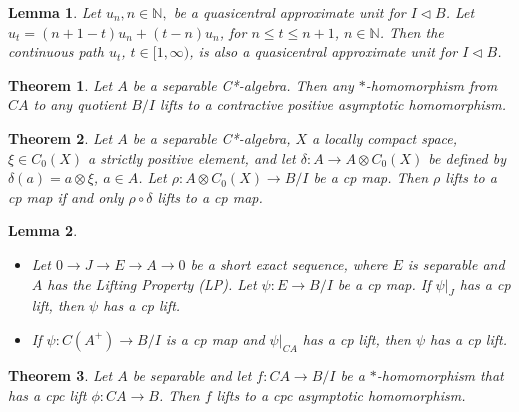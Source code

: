 \documentclass[10pt,a4paper]{amsart}
\newtheorem{lemma}{Lemma}
\newtheorem{theorem}{Theorem}
\begin{document}
\begin{lemma}\label{continuousqau} Let $u_n, n\in \mathbb N,$ be a quasicentral approximate unit for $I\triangleleft B$. Let $u_t = (n+1-t)u_n + (t-n)u_n$, for $n\le t\le n+1$, $n\in \mathbb N$. Then the continuous path $u_t$, $t\in [1, \infty)$, is also a quasicentral approximate unit for $I\triangleleft B$.
\end{lemma}

\begin{theorem}\label{cones} Let $A$ be a  separable C*-algebra. Then any $\ast$-homomorphism from $CA$ to any quotient $B/I$ lifts to a contractive positive asymptotic homomorphism.
\end{theorem}

\begin{theorem}\label{LiftingDuality}   Let $A$  be a separable C*-algebra, $X$ a locally compact space, $\xi\in C_0(X)$ a strictly positive element, and let $\delta: A \to A\otimes C_0(X)$ be defined by $\delta(a)= a\otimes \xi$, $a\in A$. Let    $\rho: A\otimes C_0(X)\to B/I$  be a cp map.  Then $\rho$  lifts to a cp map if and only $\rho\circ\delta$ lifts to a cp map.
\end{theorem}

\begin{lemma}\label{cpLiftFromUnitization} \begin{itemize}
 \item[(1)] Let $0\to J\to E\to A\to 0$ be a  short exact sequence, where $E$ is separable  and  $A$ has the  Lifting Property (LP). Let  $\psi: E\to B/I$ be a cp map. If $\psi|_J$ has a cp lift, then $\psi$ has a cp lift.

\item[(2)] If $\psi: C(A^+)\to B/I$ is a cp map and $\psi|_{CA}$ has  a cp lift, then $\psi$ has  a cp lift.
\end{itemize}
\end{lemma}

\begin{theorem}\label{ccp}   Let $A$ be separable and let $f: CA \to B/I$ be a $\ast$-homomorphism that has a cpc lift $\phi: CA \to B$.
 Then $f$ lifts to a cpc  asymptotic homomorphism.
  \end{theorem}
\end{document}
